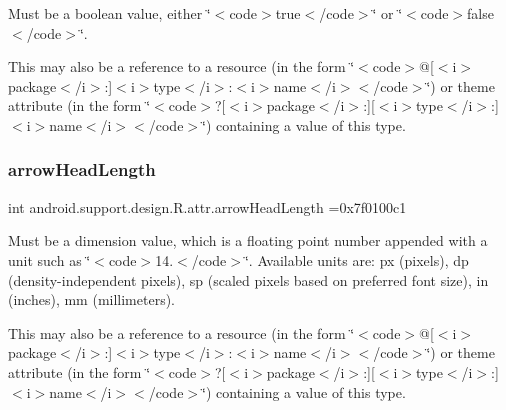 Must be a boolean value, either \char`\"{}$<$code$>$true$<$/code$>$\char`\"{} or \char`\"{}$<$code$>$false$<$/code$>$\char`\"{}. 

This may also be a reference to a resource (in the form \char`\"{}$<$code$>$@\mbox{[}$<$i$>$package$<$/i$>$\+:\mbox{]}$<$i$>$type$<$/i$>$\+:$<$i$>$name$<$/i$>$$<$/code$>$\char`\"{}) or theme attribute (in the form \char`\"{}$<$code$>$?\mbox{[}$<$i$>$package$<$/i$>$\+:\mbox{]}\mbox{[}$<$i$>$type$<$/i$>$\+:\mbox{]}$<$i$>$name$<$/i$>$$<$/code$>$\char`\"{}) containing a value of this type. \mbox{\label{classandroid_1_1support_1_1design_1_1R_1_1attr_a38f5d34b48537f094d8b501291c0c882}} 
\subsubsection{\texorpdfstring{arrow\+Head\+Length}{arrowHeadLength}}
{\footnotesize\ttfamily int android.\+support.\+design.\+R.\+attr.\+arrow\+Head\+Length =0x7f0100c1\hspace{0.3cm}{\ttfamily [static]}}

Must be a dimension value, which is a floating point number appended with a unit such as \char`\"{}$<$code$>$14.\+5sp$<$/code$>$\char`\"{}. Available units are\+: px (pixels), dp (density-\/independent pixels), sp (scaled pixels based on preferred font size), in (inches), mm (millimeters). 

This may also be a reference to a resource (in the form \char`\"{}$<$code$>$@\mbox{[}$<$i$>$package$<$/i$>$\+:\mbox{]}$<$i$>$type$<$/i$>$\+:$<$i$>$name$<$/i$>$$<$/code$>$\char`\"{}) or theme attribute (in the form \char`\"{}$<$code$>$?\mbox{[}$<$i$>$package$<$/i$>$\+:\mbox{]}\mbox{[}$<$i$>$type$<$/i$>$\+:\mbox{]}$<$i$>$name$<$/i$>$$<$/code$>$\char`\"{}) containing a value of this type. \mbox{\label{classandroid_1_1support_1_1design_1_1R_1_1attr_a09d54a1db1a3a83fd7b444ad9a8942ea}} 
